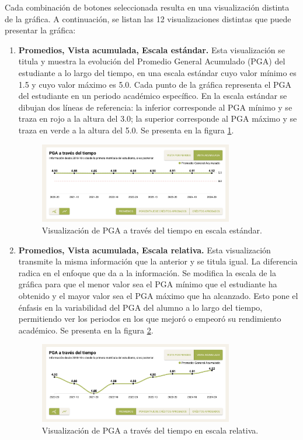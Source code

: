 Cada combinación de botones seleccionada resulta en una visualización distinta de la gráfica. A continuación, se listan las 12 visualizaciones distintas que puede presentar la gráfica:
\begin{enumerate}
	\item \textbf{Promedios, Vista acumulada, Escala estándar.} Esta visualización se titula  y muestra la evolución del Promedio General Acumulado (PGA) del estudiante a lo largo del tiempo, en una escala estándar cuyo valor mínimo es 1.5 y cuyo valor máximo es 5.0. Cada punto de la gráfica representa el PGA del estudiante en un periodo académico específico. En la escala estándar se dibujan dos líneas de referencia: la inferior corresponde al PGA mínimo y se traza en rojo a la altura del 3.0; la superior corresponde al PGA máximo y se traza en verde a la altura del 5.0. Se presenta en la figura \ref{fig:pga_estandar}.

	      \begin{figure}[H]
		      \centering
		      \includegraphics[width=0.8\textwidth]{assets/nes/pga_estandar.png}
		      \caption{Visualización de PGA a través del tiempo en escala estándar.}
		      \label{fig:pga_estandar}
	      \end{figure}

	\item \textbf{Promedios, Vista acumulada, Escala relativa.} Esta visualización transmite la misma información que la anterior y se titula igual. La diferencia radica en el enfoque que da a la información. Se modifica la escala de la gráfica para que el menor valor sea el PGA mínimo que el estudiante ha obtenido y el mayor valor sea el PGA máximo que ha alcanzado. Esto pone el énfasis en la variabilidad del PGA del alumno a lo largo del tiempo, permitiendo ver los periodos en los que mejoró o empeoró su rendimiento académico. Se presenta en la figura \ref{fig:pga_relativo}.

	      \begin{figure}[H]
		      \centering
		      \includegraphics[width=0.8\textwidth]{assets/nes/pga_relativo.png}
		      \caption{Visualización de PGA a través del tiempo en escala relativa.}
		      \label{fig:pga_relativo}
	      \end{figure}


\end{enumerate}

